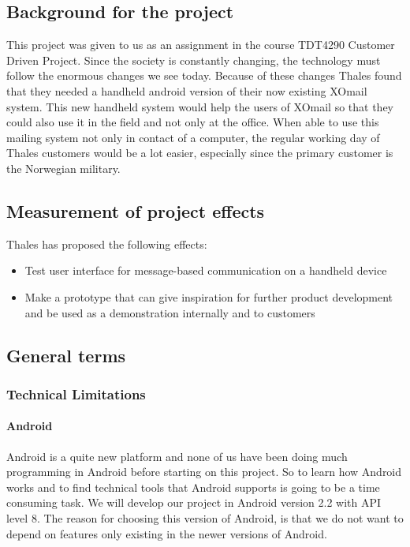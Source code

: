 \subsection{Background for the project}

This project was given to us as an assignment in the course TDT4290 Customer Driven Project. Since the society is constantly changing, the technology must follow the enormous changes we see today. Because of these changes Thales found that they needed a handheld android version of their now existing XOmail system. This new handheld system would help the users of XOmail so that they could also use it in the field and not only at the office. When able to use this mailing system not only in contact of a computer, the regular working day of Thales customers would be a lot easier, especially since the primary customer is the Norwegian military.

\subsection{Measurement of project effects}

Thales has proposed the following effects:
\begin{itemize}
\item{}Test user interface for message-based communication on a handheld device
\item{}Make a prototype that can give inspiration for further product development and be used as a demonstration internally and to customers
\end{itemize}

\newpage
\subsection{General terms}

\subsubsection{Technical Limitations}

\paragraph{Android}
Android is a quite new platform and none of us have been doing much programming in Android before starting on this project. So to learn how Android works and to find technical tools that Android supports is going to be a time consuming task. We will develop our project in Android version 2.2 with API level 8. The reason for choosing this version of Android, is that we do not want to depend on features only existing in the newer versions of Android. 

